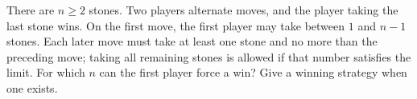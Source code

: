 There are $n\ge2$ stones. Two players alternate moves, and the player taking the last stone wins. On the first move, the first player may take between $1$ and $n-1$ stones. Each later move must take at least one stone and no more than the preceding move; taking all remaining stones is allowed if that number satisfies the limit. For which $n$ can the first player force a win? Give a winning strategy when one exists.
